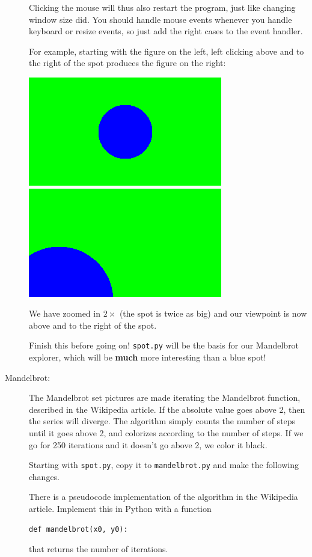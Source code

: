 \documentclass[12pt]{article}
\begin{document}
\begin{description}
Clicking the mouse will thus also restart the
program, just like changing window size did.
You should handle mouse events whenever you
handle keyboard or resize events, so just add
the right cases to the event handler.

For example, starting with the figure on the left,
left clicking above and to the right of the spot 
produces the figure on the right:

\includegraphics[scale=0.5]{spot}
\hfill
\includegraphics[scale=0.5]{spot04}

We have zoomed in $2\times$ (the spot is twice as big)
and our viewpoint is now above and to the right
of the spot.

Finish this before going on! 
 \lstinline{spot.py}
will be the basis for our Mandelbrot explorer,
which will be {\bf much} more interesting than
a blue spot!



\item[Mandelbrot:]
The Mandelbrot set
pictures are made iterating the  Mandelbrot
function, described in the Wikipedia article.  
If the absolute value goes above 2,
then the series will diverge.  The algorithm simply counts
the number of steps until it goes above 2,
and colorizes according to the number of steps.  
If we go for 250
iterations and it doesn't go above 2, we color it
black.

Starting with \lstinline{spot.py}, copy it to 
\lstinline{mandelbrot.py} and make the following
changes.

There is a pseudocode implementation of the
algorithm in the Wikipedia article.  Implement
this in Python with a function
\begin{lstlisting}
def mandelbrot(x0, y0):
\end{lstlisting}
that returns the number of iterations.


\end{description}
\end{document}
